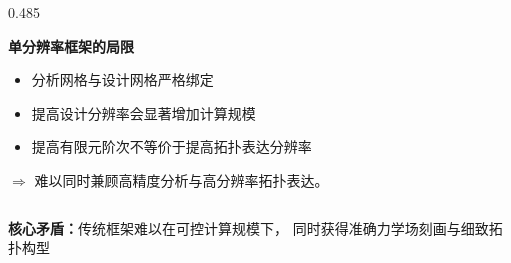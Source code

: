\documentclass[notheorems]{beamer}
\begin{document}
\begin{frame}
\begin{columns}[T,onlytextwidth]
\begin{column}{0.485\textwidth}
\begin{tcolorbox}
					{\fontsize{7.5}{11}\selectfont\sffamily
						\textcolor{structure.fg}{\textbf{单分辨率框架的局限}}
						
						\vspace{0.5em}
						
						\begin{itemize}
							\setlength{\itemsep}{4pt}
							\item 分析网格与设计网格严格绑定
							\item 提高设计分辨率会显著增加计算规模
							\item 提高有限元阶次不等价于提高拓扑表达分辨率
						\end{itemize}
						
						\vfill
						
						\textcolor{structure.fg}{\(\Rightarrow\)}
						难以同时兼顾高精度分析与高分辨率拓扑表达。
					}
					
				\end{tcolorbox}
			\end{column}
			
		\end{columns}
		
		\begin{tcolorbox}[
			colback=structure.fg, colframe=structure.fg,
			arc=3pt, boxrule=0pt,
			top=3.5pt, bottom=3.5pt, left=8pt, right=8pt]
			\centering
			{\fontsize{8}{11}\selectfont\sffamily\color{white}
				\textbf{核心矛盾：}传统框架难以在可控计算规模下，
				同时获得准确力学场刻画与细致拓扑构型}
		\end{tcolorbox}
		
	\end{frame}
	
	
\end{document}

